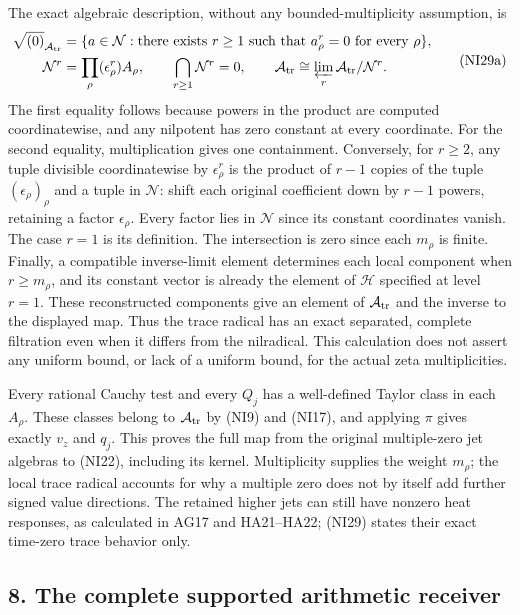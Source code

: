 \documentclass[
  10pt,
  a4paper,
]{article}
\begin{document}
The exact algebraic description, without any bounded-multiplicity
assumption, is \[
\begin{split}
\sqrt{(0)}_{\mathcal A_{\rm tr}}
&=\{a\in\mathcal N:\text{there exists }r\ge1
\text{ such that }a_\rho^r=0\text{ for every }\rho\},\\
\mathcal N^r&=\prod_\rho(\epsilon_\rho^r)A_\rho,
\qquad \bigcap_{r\ge1}\mathcal N^r=0,
\qquad \mathcal A_{\rm tr}\cong
\varprojlim_r\mathcal A_{\rm tr}/\mathcal N^r.
\end{split}
\tag{NI29a}
\] The first equality follows because powers in the product are computed
coordinatewise, and any nilpotent has zero constant at every coordinate.
For the second equality, multiplication gives one containment.
Conversely, for \(r\ge2\), any tuple divisible coordinatewise by
\(\epsilon_\rho^r\) is the product of \(r-1\) copies of the tuple
\((\epsilon_\rho)_\rho\) and a tuple in \(\mathcal N\): shift each
original coefficient down by \(r-1\) powers, retaining a factor
\(\epsilon_\rho\). Every factor lies in \(\mathcal N\) since its
constant coordinates vanish. The case \(r=1\) is its definition. The
intersection is zero since each \(m_\rho\) is finite. Finally, a
compatible inverse-limit element determines each local component when
\(r\ge m_\rho\), and its constant vector is already the element of
\(\mathcal H\) specified at level \(r=1\). These reconstructed
components give an element of \(\mathcal A_{\rm tr}\) and the inverse to
the displayed map. Thus the trace radical has an exact separated,
complete filtration even when it differs from the nilradical. This
calculation does not assert any uniform bound, or lack of a uniform
bound, for the actual zeta multiplicities.

Every rational Cauchy test and every \(Q_j\) has a well-defined Taylor
class in each \(A_\rho\). These classes belong to
\(\mathcal A_{\rm tr}\) by (NI9) and (NI17), and applying \(\pi\) gives
exactly \(v_z\) and \(q_j\). This proves the full map from the original
multiple-zero jet algebras to (NI22), including its kernel. Multiplicity
supplies the weight \(m_\rho\); the local trace radical accounts for why
a multiple zero does not by itself add further signed value directions.
The retained higher jets can still have nonzero heat responses, as
calculated in AG17 and HA21--HA22; (NI29) states their exact time-zero
trace behavior only.

\subsection{8. The complete supported arithmetic
receiver}\label{the-complete-supported-arithmetic-receiver}
\end{document}
